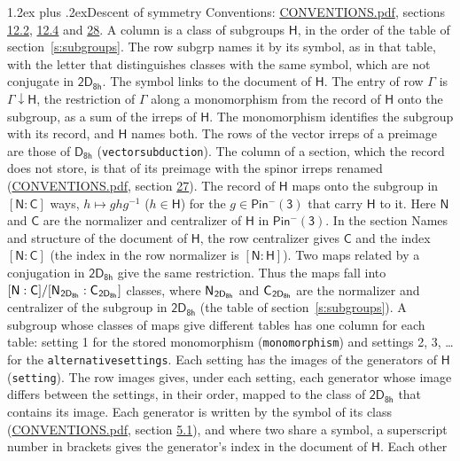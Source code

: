 \documentclass[10pt,a4paper]{article}
\makeatletter
\renewcommand\section{\@startsection{section}{1}{\z@}{-3ex plus -1ex minus -.2ex}%
  {1.2ex plus .2ex}{\normalfont\large\sffamily\bfseries\color{parttitle}}}
\numberwithin{equation}{section}
\newcommand{\grp}[1]{\mathsf{#1}}
\newcommand{\grpindex}[2]{[#1 : #2]}
\newcommand{\restr}[2]{#1\!\downarrow#2}
\newcommand{\hairsp}{\mkern1mu}
\makeatother
\begin{document}
\section{Descent of symmetry}\label{s:subduction}
Conventions: \href{../../CONVENTIONS.pdf}{CONVENTIONS.pdf}, sections \href{../../../rotation/CONVENTIONS.pdf\#conv.12.2}{12.2}, \href{../../../rotation/CONVENTIONS.pdf\#conv.12.4}{12.4} and \href{../../CONVENTIONS.pdf\#conv.28}{28}.
A column is a class of subgroups $\grp{H}$, in the order of the table of section~\ref{s:subgroups}. The row subgrp names it by its symbol, as in that table, with the letter that distinguishes classes with the same symbol, which are not conjugate in $\grp{2D_{8h}}$. The symbol links to the document of $\grp{H}$. The entry of row $\Gamma$ is $\restr{\Gamma}{\grp{H}}$, the restriction of $\Gamma$ along a monomorphism from the record of $\grp{H}$ onto the subgroup, as a sum of the irreps of $\grp{H}$. The monomorphism identifies the subgroup with its record, and $\grp{H}$ names both. The rows of the vector irreps of a preimage are those of \href{../../../rotation/data/pdf/D8h.pdf}{$\grp{D_{8h}}$} (\texttt{vectorsubduction}). The column of a section, which the record does not store, is that of its preimage with the spinor irreps renamed (\href{../../CONVENTIONS.pdf}{CONVENTIONS.pdf}, section \href{../../CONVENTIONS.pdf\#conv.27}{27}). \label{n:group.normalizer.o3}\label{n:group.centralizer.o3}\label{n:element.h}The record of $\grp{H}$ maps onto the subgroup in $\grpindex{\grp{N}}{\grp{C}}$ ways, $h \mapsto g h g^{-1}$ ($h \in \grp{H}$) for the $g \in \grp{Pin^{-}(3)}$ that carry $\grp{H}$ to it. Here $\grp{N}$ and $\grp{C}$ are the normalizer and centralizer of $\grp{H}$ in \href{Pinminus3.pdf}{$\grp{Pin^{-}(3)}$}. In the section Names and structure of the document of $\grp{H}$, the row centralizer gives $\grp{C}$ and the index $\grpindex{\grp{N}}{\grp{C}}$ (the index in the row normalizer is $\grpindex{\grp{N}}{\grp{H}}$). Two maps related by a conjugation in $\grp{2D_{8h}}$ give the same restriction. Thus the maps fall into $\grpindex{\grp{N}}{\grp{C}}/\grpindex{\grp{N}_{\hairsp \grp{2D_{8h}}}}{\grp{C}_{\hairsp \grp{2D_{8h}}}}$ classes, where $\grp{N}_{\hairsp \grp{2D_{8h}}}$ and $\grp{C}_{\hairsp \grp{2D_{8h}}}$ are the normalizer and centralizer of the subgroup in $\grp{2D_{8h}}$ (the table of section~\ref{s:subgroups}). \label{n:head.setting}A subgroup whose classes of maps give different tables has one column for each table: setting 1 for the stored monomorphism (\texttt{monomorphism}) and settings 2, 3, \dots{} for the \texttt{alternativesettings}. Each setting has the images of the generators of $\grp{H}$ (\texttt{setting}). \label{n:head.images}The row images gives, under each setting, each generator whose image differs between the settings, in their order, mapped to the class of $\grp{2D_{8h}}$ that contains its image. \label{n:element.generator.index}Each generator is written by the symbol of its class (\href{../../CONVENTIONS.pdf}{CONVENTIONS.pdf}, section \href{../../../rotation/CONVENTIONS.pdf\#conv.5.1}{5.1}), and where two share a symbol, a superscript number in brackets gives the generator's index in the document of $\grp{H}$. \label{n:irrep.Delta}Each other 
\end{document}
